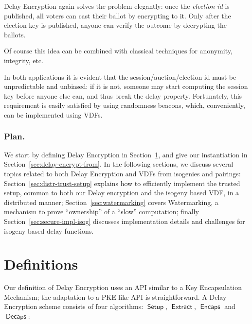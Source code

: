 \documentclass{llncs}
\DeclareMathOperator{\Setup}{\mathsf{Setup}}
\DeclareMathOperator{\Extract}{\mathsf{Extract}}
\DeclareMathOperator{\Encaps}{\mathsf{Encaps}}
\DeclareMathOperator{\Decaps}{\mathsf{Decaps}}
\begin{document}
Delay Encryption again solves the problem elegantly: once the
\emph{election id} is published, all voters can cast their ballot by
encrypting to it. %
Only after the election key is published, anyone can verify the
outcome by decrypting the ballots. %

Of course this idea can be combined with classical techniques for
anonymity, integrity, etc.

\medskip

In both applications it is evident that the session/auction/election
id must be unpredictable and unbiased: if it is not, someone may start
computing the session key before anyone else can, and thus break the
delay property. %
Fortunately, this requirement is easily satisfied by using randomness
beacons, which, conveniently, can be implemented using VDFs.

\subsubsection{Plan.}
We start by defining Delay Encryption in
Section~\ref{sec:definitions}, and give our instantiation in
Section~\ref{sec:delay-encrypt-from}. %
In the following sections, we discuss several topics related to both
Delay Encryption and VDFs from isogenies and pairings:
Section~\ref{sec:distr-trust-setup} explains how to efficiently
implement the trusted setup, common to both our Delay encryption and
the isogeny based VDF, in a distributed manner;
Section~\ref{sec:watermarking} covers Watermarking, a mechanism to
prove ``ownership'' of a ``slow'' computation; finally
Section~\ref{sec:secure-impl-isog} discusses implementation details
and challenges for isogeny based delay functions.


\section{Definitions}
\label{sec:definitions}

Our definition of Delay Encryption uses an API similar to a Key
Encapsulation Mechanism; the adaptation to a PKE-like API is
straightforward. A Delay Encryption scheme consists of four
algorithms: $\Setup$, $\Extract$, $\Encaps$ and $\Decaps$:
\end{document}
